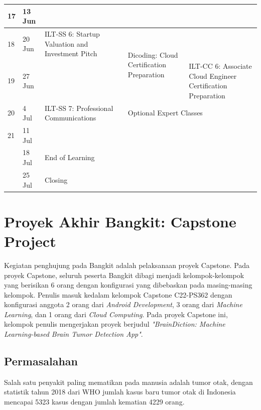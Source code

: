 \begin{longtable}{|p{2cm}p{2cm}|p{2cm}p{2cm}p{2cm}p{2cm}|}
	\multicolumn{1}{|p{1cm}|}{17} &
	13 Jun &
	\multicolumn{1}{p{2cm}|}{} &
	\multicolumn{1}{p{2cm}|}{} &
	\multicolumn{2}{p{2cm}|}{} \\ \hline
	\multicolumn{1}{|p{1cm}|}{18} &
	20 Jun &
	\multicolumn{1}{p{2cm}|}{ILT-SS 6: Startup Valuation and Investment Pitch} &
	\multicolumn{1}{p{2cm}|}{} &
	\multicolumn{1}{p{2cm}|}{\multirow{2}{2cm}{Dicoding: Cloud Certification Preparation}} &
	\\ \cline{1-4} \cline{6-6} 
	\multicolumn{1}{|p{1cm}|}{19} &
	27 Jun &
	\multicolumn{1}{p{2cm}|}{} &
	\multicolumn{1}{p{2cm}|}{} &
	\multicolumn{1}{p{2cm}|}{} &
	ILT-CC 6: Associate Cloud Engineer Certification Preparation \\ \hline
	\multicolumn{1}{|p{1cm}|}{20} &
	4 Jul &
	\multicolumn{1}{p{2cm}|}{ILT-SS 7: Professional Communications} &
	\multicolumn{1}{p{2cm}|}{} &
	\multicolumn{2}{p{2cm}|}{Optional Expert Classes} \\ \hline
	\multicolumn{1}{|p{1cm}|}{21} &
	11 Jul &
	\multicolumn{1}{p{2cm}|}{} &
	\multicolumn{1}{p{2cm}|}{} &
	\multicolumn{1}{p{2cm}|}{} &
	\\ \hline
	\multicolumn{1}{|p{1cm}|}{} &
	18 Jul &
	\multicolumn{4}{p{6cm}|}{End of Learning} \\ \hline
	\multicolumn{1}{|p{1cm}|}{} &
	25 Jul &
	\multicolumn{4}{p{2cm}|}{Closing} \\ \hline
\end{longtable}

\section{Proyek Akhir Bangkit: Capstone Project}
Kegiatan penghujung pada Bangkit adalah pelaksanaan proyek Capstone. Pada proyek Capstone, seluruh peserta Bangkit dibagi menjadi kelompok-kelompok yang berisikan 6 orang dengan konfigurasi yang dibebaskan pada masing-masing kelompok. Penulis masuk kedalam kelompok Capstone C22-PS362 dengan konfigurasi anggota 2 orang dari \textit{Android Development}, 3 orang dari \textit{Machine Learning}, dan 1 orang dari \textit{Cloud Computing}. Pada proyek Capstone ini, kelompok penulis mengerjakan proyek berjudul \textit{"BrainDiction: Machine Learning-based Brain Tumor Detection App"}.

\subsection{Permasalahan}
Salah satu penyakit paling mematikan pada manusia adalah tumor otak, dengan statistik tahun 2018 dari WHO jumlah kasus baru tumor otak di Indonesia mencapai 5323 kasus dengan jumlah kematian 4229 orang.
